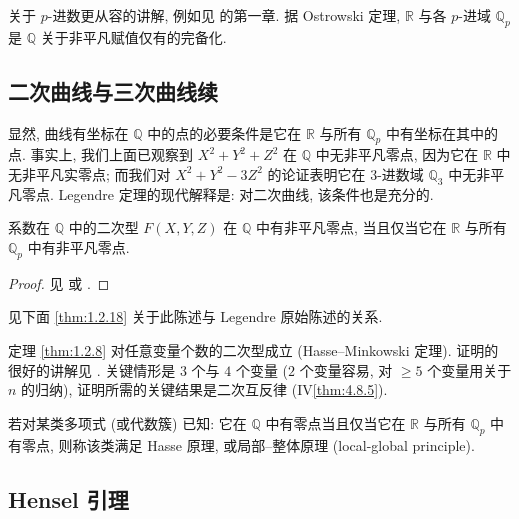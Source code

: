 \begin{remarkstar}
关于 $p$-进数更从容的讲解, 例如见 \cite{koblitz1977} 的第一章. 据 Ostrowski 定理, $\mathbb{R}$ 与各 $p$-进域 $\mathbb{Q}_p$ 是 $\mathbb{Q}$ 关于非平凡赋值仅有的完备化.
\end{remarkstar}

\subsection*{二次曲线与三次曲线续}

显然, 曲线有坐标在 $\mathbb{Q}$ 中的点的必要条件是它在 $\mathbb{R}$ 与所有 $\mathbb{Q}_p$ 中有坐标在其中的点. 事实上, 我们上面已观察到 $X^2 + Y^2 + Z^2$ 在 $\mathbb{Q}$ 中无非平凡零点, 因为它在 $\mathbb{R}$ 中无非平凡实零点; 而我们对 $X^2 + Y^2 - 3Z^2$ 的论证表明它在 $3$-进数域 $\mathbb{Q}_3$ 中无非平凡零点. Legendre 定理的现代解释是: 对二次曲线, 该条件也是充分的.

\begin{theorem}[Legendre] \label{thm:1.2.8} 
系数在 $\mathbb{Q}$ 中的二次型 $F(X,Y,Z)$ 在 $\mathbb{Q}$ 中有非平凡零点, 当且仅当它在 $\mathbb{R}$ 与所有 $\mathbb{Q}_p$ 中有非平凡零点.
\end{theorem}

\begin{proof}
见 \cite[Chapter 3]{cassels1991} 或 \cite[Chapter IV]{serre1973}.
\end{proof}

见下面 \ref{thm:1.2.18} 关于此陈述与 Legendre 原始陈述的关系.

\begin{aside} \label{thm:1.2.9} 
定理 \ref{thm:1.2.8} 对任意变量个数的二次型成立 (Hasse--Minkowski 定理). 证明的很好的讲解见 \cite[Chap.~IV]{serre1973}. 关键情形是 $3$ 个与 $4$ 个变量 ($2$ 个变量容易, 对 $\ge 5$ 个变量用关于 $n$ 的归纳), 证明所需的关键结果是二次互反律 (IV\ref{thm:4.8.5}).

若对某类多项式 (或代数簇) 已知: 它在 $\mathbb{Q}$ 中有零点当且仅当它在 $\mathbb{R}$ 与所有 $\mathbb{Q}_p$ 中有零点, 则称该类满足 Hasse 原理, 或局部--整体原理 (local-global principle).
\end{aside}

\subsection*{Hensel 引理}


